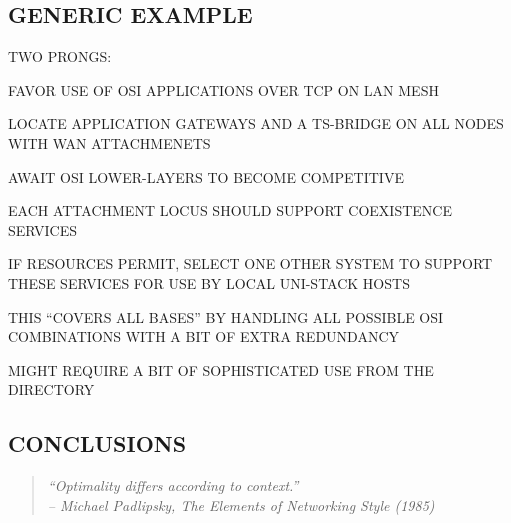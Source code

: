 \begin{bwslide}
\part*	{GENERIC EXAMPLE}\bf

\begin{nrtc}
\item	TWO PRONGS:
    \begin{nrtc}
    \item	FAVOR USE OF OSI APPLICATIONS OVER TCP ON LAN MESH

    \item	LOCATE APPLICATION GATEWAYS AND A TS-BRIDGE ON ALL NODES
		WITH WAN ATTACHMENETS
    \end{nrtc}

\item	AWAIT OSI LOWER-LAYERS TO BECOME COMPETITIVE
\end{nrtc}
\end{bwslide}


\begin{bwslide}

\begin{nrtc}
\item	EACH ATTACHMENT LOCUS SHOULD SUPPORT COEXISTENCE SERVICES

\item	IF RESOURCES PERMIT, SELECT ONE OTHER SYSTEM TO SUPPORT THESE
	SERVICES FOR USE BY LOCAL UNI-STACK HOSTS

\item	THIS ``COVERS ALL BASES'' BY HANDLING ALL POSSIBLE OSI COMBINATIONS
	WITH A BIT OF EXTRA REDUNDANCY

\item	MIGHT REQUIRE A BIT OF SOPHISTICATED USE FROM THE DIRECTORY
\end{nrtc}
\end{bwslide}




\begin{bwslide}
\part*	{CONCLUSIONS}\bf

\begin{quote}\em
``Optimality differs according to context.''\\ \raggedleft
-- Michael Padlipsky, The Elements of Networking Style (1985)
\end{quote}
\end{bwslide}


